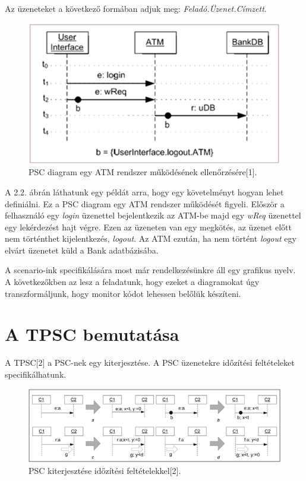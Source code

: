 Az üzeneteket a következő formában adjuk meg: \textit{Feladó.Üzenet.Címzett}.

\begin{figure}[!ht]
    \centering
    \includegraphics[width=130mm, keepaspectratio]{figures/3abra.png}
    \caption{PSC diagram egy ATM rendszer működésének ellenőrzésére[1].}
\end{figure}
A 2.2. ábrán láthatunk egy példát arra, hogy egy követelményt hogyan lehet definiálni.
Ez a PSC diagram egy ATM rendszer működését figyeli.
Először a felhasználó egy \textit{login} üzenettel bejelentkezik az ATM-be majd egy \textit{wReq} üzenettel egy lekérdezést hajt végre.
Ezen az üzeneten van egy megkötés, az üzenet előtt nem történthet kijelentkezés, \textit{logout}.
Az ATM ezután, ha nem történt \textit{logout} egy elvárt üzenetet küld a Bank adatbázisába.

A scenario-ink specifikálására most már rendelkezésünkre áll egy grafikus nyelv.
A következőkben az lesz a feladatunk, hogy ezeket a diagramokat úgy transzformáljunk, hogy monitor kódot lehessen belőlük készíteni.


\clearpage\section{A TPSC bemutatása}
A TPSC[2] a PSC-nek egy kiterjesztése.
A PSC üzenetekre időzítési feltételeket specifikálhatunk.

\begin{figure}[!ht]
    \centering
    \includegraphics[width=150mm, keepaspectratio]{figures/4abra.png}
    \caption{PSC kiterjesztése időzítési feltételekkel[2].}
\end{figure}

